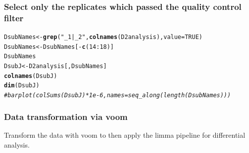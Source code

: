 \documentclass[a4paper]{article}
\makeatletter
\newcommand{\hlnum}[1]{\textcolor[rgb]{0.686,0.059,0.569}{#1}}%
\newcommand{\hlstr}[1]{\textcolor[rgb]{0.192,0.494,0.8}{#1}}%
\newcommand{\hlcom}[1]{\textcolor[rgb]{0.678,0.584,0.686}{\textit{#1}}}%
\newcommand{\hlopt}[1]{\textcolor[rgb]{0,0,0}{#1}}%
\newcommand{\hlstd}[1]{\textcolor[rgb]{0.345,0.345,0.345}{#1}}%
\newcommand{\hlkwb}[1]{\textcolor[rgb]{0.69,0.353,0.396}{#1}}%
\newcommand{\hlkwc}[1]{\textcolor[rgb]{0.333,0.667,0.333}{#1}}%
\newcommand{\hlkwd}[1]{\textcolor[rgb]{0.737,0.353,0.396}{\textbf{#1}}}%
\newenvironment{kframe}{%
 \def\at@end@of@kframe{}%
 \ifinner\ifhmode%
  \def\at@end@of@kframe{\end{minipage}}%
  \begin{minipage}{\columnwidth}%
 \fi\fi%
 \def\FrameCommand##1{\hskip\@totalleftmargin \hskip-\fboxsep
 \colorbox{shadecolor}{##1}\hskip-\fboxsep
     \hskip-\linewidth \hskip-\@totalleftmargin \hskip\columnwidth}%
 \MakeFramed {\advance\hsize-\width
   \@totalleftmargin\z@ \linewidth\hsize
   \@setminipage}}%
 {\par\unskip\endMakeFramed%
 \at@end@of@kframe}
\newenvironment{knitrout}{}{} %
\makeatother
\begin{document}
\subsubsection*{Select only the replicates which passed the quality control filter}

\begin{knitrout}
\color{fgcolor}\begin{kframe}
\begin{alltt}
\hlstd{DsubNames} \hlkwb{<-} \hlkwd{grep}\hlstd{(}\hlstr{"_1|_2"}\hlstd{,} \hlkwd{colnames}\hlstd{(D2analysis),} \hlkwc{value} \hlstd{=} \hlnum{TRUE}\hlstd{)}
\hlstd{DsubNames} \hlkwb{<-} \hlstd{DsubNames[}\hlopt{-}\hlkwd{c}\hlstd{(}\hlnum{14}\hlopt{:}\hlnum{18}\hlstd{)]}
\hlstd{DsubNames}
\hlstd{DsubJ} \hlkwb{<-} \hlstd{D2analysis[, DsubNames]}
\hlkwd{colnames}\hlstd{(DsubJ)}
\hlkwd{dim}\hlstd{(DsubJ)}
\hlcom{# barplot(colSums(DsubJ)*1e-6, names=seq_along(length(DsubNames)))}
\end{alltt}
\end{kframe}
\end{knitrout}

\subsubsection*{Data transformation via voom}
Transform the data with voom to then apply the limma pipeline for differential analysis.
\end{document}
